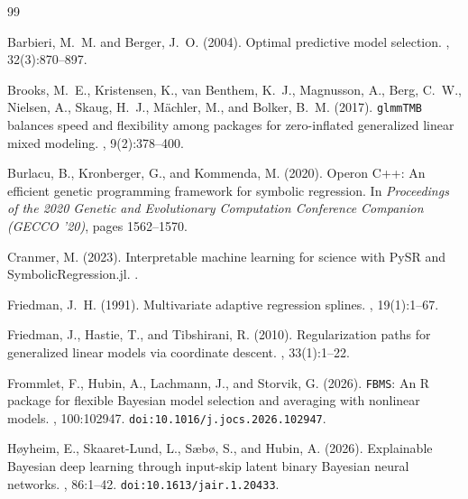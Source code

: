\documentclass[11pt,a4paper]{article}
\begin{document}

\begin{thebibliography}{99}

Barbieri, M.~M. and Berger, J.~O. (2004).
\newblock Optimal predictive model selection.
, 32(3):870--897.

Brooks, M.~E., Kristensen, K., van Benthem, K.~J., Magnusson, A., Berg, C.~W., Nielsen, A., Skaug, H.~J., M{\"a}chler, M., and Bolker, B.~M. (2017).
\newblock \texttt{glmmTMB} balances speed and flexibility among packages for zero-inflated generalized linear mixed modeling.
, 9(2):378--400.

Burlacu, B., Kronberger, G., and Kommenda, M. (2020).
\newblock Operon C++: An efficient genetic programming framework for symbolic regression.
\newblock In {\em Proceedings of the 2020 Genetic and Evolutionary Computation Conference Companion (GECCO '20)}, pages 1562--1570.

Cranmer, M. (2023).
\newblock Interpretable machine learning for science with {PySR} and {SymbolicRegression.jl}.
.

Friedman, J.~H. (1991).
\newblock Multivariate adaptive regression splines.
, 19(1):1--67.

Friedman, J., Hastie, T., and Tibshirani, R. (2010).
\newblock Regularization paths for generalized linear models via coordinate descent.
, 33(1):1--22.

Frommlet, F., Hubin, A., Lachmann, J., and Storvik, G. (2026).
\newblock \texttt{FBMS}: An {R} package for flexible {B}ayesian model selection and averaging with nonlinear models.
, 100:102947.
\newblock \texttt{doi:10.1016/j.jocs.2026.102947}.

H{\o}yheim, E., Skaaret-Lund, L., S{\ae}b{\o}, S., and Hubin, A. (2026).
\newblock Explainable {B}ayesian deep learning through input-skip latent binary {B}ayesian neural networks.
, 86:1--42.
\newblock \texttt{doi:10.1613/jair.1.20433}.


\end{thebibliography}
\end{document}
